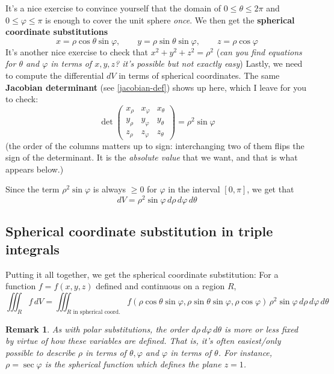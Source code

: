 \documentclass[12pt]{article}
\numberwithin{equation}{subsection}
\numberwithin{figure}{subsection}
\theoremstyle{note}
\newtheorem{remark}[subsection]{Remark}
\begin{document}
{It's a nice exercise to convince yourself that the domain of $0\leq \theta\leq 2\pi$ and $0\leq \varphi \leq \pi$ is enough to cover the unit sphere \textit{once}. We then get the \textbf{spherical coordinate substitutions}
\begin{equation} 
	x=\rho \cos \theta \sin \varphi, \qquad y=\rho \sin \theta \sin \varphi, \qquad z=\rho \cos \varphi \label{spherical-coord}
\end{equation}
It's another nice exercise to check that $x^2+y^2+z^2=\rho^2$ (\textit{can you find equations for $\theta$ and $\varphi$ in terms of $x,y,z$? it's possible but not exactly easy}) Lastly, we need to compute the differential $dV$ in terms of spherical coordinates. The same \textbf{Jacobian determinant} (see \ref{jacobian-def}) shows up here, which I leave for you to check: \[ \det \begin{pmatrix} x_{\rho} & x_{\varphi} & x_{\theta} \\ y_{\rho} & y_{\varphi} & y_{\theta} \\ z_{\rho} & z_{\varphi} & z_{\theta} \end{pmatrix} =\rho^2\sin\varphi\] (the order of the columns matters up to sign: interchanging two of them flips the sign of the determinant. It is the \textit{absolute value} that we want, and that is what appears below.) 


Since the term $\rho^2\sin\varphi$ is always $\geq 0$ for $\varphi$ in the interval $[0,\pi]$, we get that \begin{equation} dV= \rho^2 \sin\varphi \, d\rho \,d\varphi\, d\theta \label{dV-spherical} \end{equation}

\subsection{Spherical coordinate substitution in triple integrals} Putting it all together, we get the spherical coordinate substitution: For a function $f=f(x,y,z)$ defined and continuous on a region $R$, \begin{equation}\iiint_R f\,dV=\iiint_{\text{$R$ in spherical coord.}} f(\rho\cos\theta\sin\varphi, \rho\sin\theta\sin\varphi, \rho\cos\varphi)\, \rho^2 \sin\varphi \,d\rho\,d\varphi \, d\theta \end{equation}

\begin{remark}
As with polar substitutions, the order $d\rho\, d\varphi\, d\theta$ is more or less fixed by virtue of how these variables are defined. That is, it's often easiest/only possible to describe $\rho$ in terms of $\theta, \varphi$ and $\varphi$ in terms of $\theta$. For instance, $\rho=\sec\varphi$ is the spherical function which defines the plane $z=1$.


\end{remark}}
\end{document}
